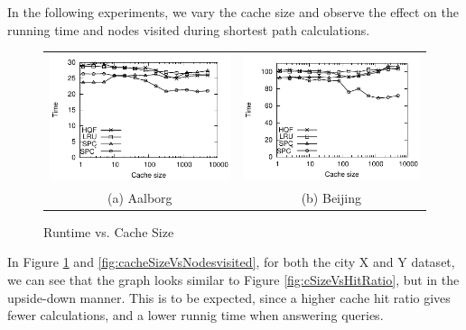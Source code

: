 %
In the following experiments, we vary the cache size and observe the effect on the running time and nodes visited during shortest path calculations.






\begin{figure}[htb]
\center
  \begin{tabular}{@{}c@{ }c@{}}
     \includegraphics[width=0.5\columnwidth]{figures/cachesize_runtime_aal.pdf}
     &
     \includegraphics[width=0.5\columnwidth]{figures/cachesize_runtime_bei.pdf}
      \\
     (a) Aalborg & (b)  Beijing
     \end{tabular}
\caption{Runtime vs. Cache Size}
\label{fig:cacheSizeVsHitRuntime}
\end{figure}

In Figure \ref{fig:cacheSizeVsHitRuntime} and \ref{fig:cacheSizeVsNodesvisited}, for both the city X and Y dataset,  we can see that the graph looks similar to Figure \ref{fig:cSizeVsHitRatio}, but in the upside-down manner. This is to be expected, since a higher cache hit ratio gives fewer \spath calculations, and a lower runnig time when answering queries.

